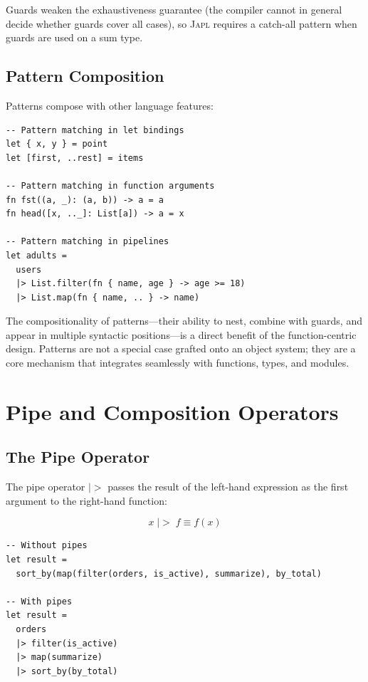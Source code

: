 \documentclass[11pt,a4paper]{article}
\newcommand{\japl}{\textsc{Japl}}
\newcommand{\pipe}{\;|\!>\;}
\begin{document}
Guards weaken the exhaustiveness guarantee (the compiler cannot in general decide whether guards cover all cases), so \japl{} requires a catch-all pattern when guards are used on a sum type.

\subsection{Pattern Composition}

Patterns compose with other language features:

\begin{lstlisting}
-- Pattern matching in let bindings
let { x, y } = point
let [first, ..rest] = items

-- Pattern matching in function arguments
fn fst((a, _): (a, b)) -> a = a
fn head([x, .._]: List[a]) -> a = x

-- Pattern matching in pipelines
let adults =
  users
  |> List.filter(fn { name, age } -> age >= 18)
  |> List.map(fn { name, .. } -> name)
\end{lstlisting}

The compositionality of patterns---their ability to nest, combine with guards, and appear in multiple syntactic positions---is a direct benefit of the function-centric design. Patterns are not a special case grafted onto an object system; they are a core mechanism that integrates seamlessly with functions, types, and modules.


\section{Pipe and Composition Operators}
\label{sec:pipes}

\subsection{The Pipe Operator}

The pipe operator $|>$ passes the result of the left-hand expression as the first argument to the right-hand function:

\[
x \pipe f \equiv f(x)
\]

\begin{lstlisting}
-- Without pipes
let result =
  sort_by(map(filter(orders, is_active), summarize), by_total)

-- With pipes
let result =
  orders
  |> filter(is_active)
  |> map(summarize)
  |> sort_by(by_total)
\end{lstlisting}
\end{document}

